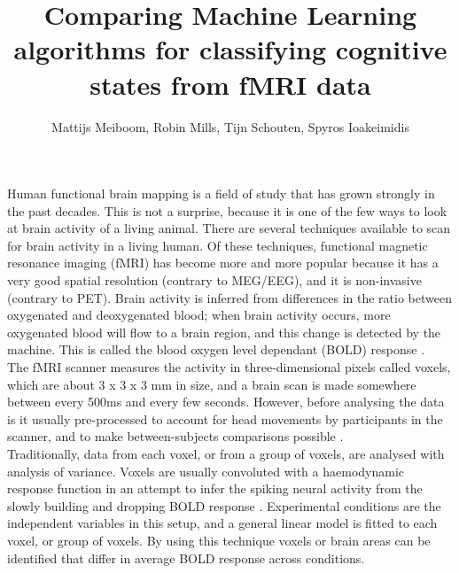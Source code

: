 \documentclass[preprint,journal,11pt]{vgtc}
\title{Comparing Machine Learning algorithms for classifying cognitive states from fMRI data}
\author{Mattijs Meiboom, Robin Mills, Tijn Schouten, Spyros Ioakeimidis}
\begin{document}
\label{sec:introduction}
\maketitle
Human functional brain mapping is a field of study that has grown strongly in the past decades. This is not a surprise, because it is one of the few ways to look at brain activity of a living animal. There are several techniques available to scan for brain activity in a living human. Of these techniques, functional magnetic resonance imaging (fMRI) has become more and more popular because it has a very good spatial resolution (contrary to MEG/EEG), and it is non-invasive (contrary to PET). Brain activity is inferred from differences in the ratio between oxygenated and deoxygenated blood; when brain activity occurs, more oxygenated blood will flow to a brain region, and this change is detected by the machine. This is called the blood oxygen level dependant (BOLD) response \cite{sm:2012fMRI}.\\
\indent The fMRI scanner measures the activity in three-dimensional pixels called voxels, which are about 3 x 3 x 3 mm in size, and a brain scan is made somewhere between every 500ms and every few seconds. However, before analysing the data is it usually pre-processed to account for head movements by participants in the scanner, and to make between-subjects comparisons possible \cite{sl:2009rl}.\\
\indent Traditionally, data from each voxel, or from a group of voxels, are analysed with analysis of variance. Voxels are usually convoluted with a haemodynamic response function in an attempt to infer the spiking neural activity from the slowly building and dropping BOLD response \cite{he:2002na}. Experimental conditions are the independent variables in this setup, and a general linear model is fitted to each voxel, or group of voxels. By using this technique voxels or brain areas can be identified that differ in average BOLD response across conditions.\\
\end{document}
